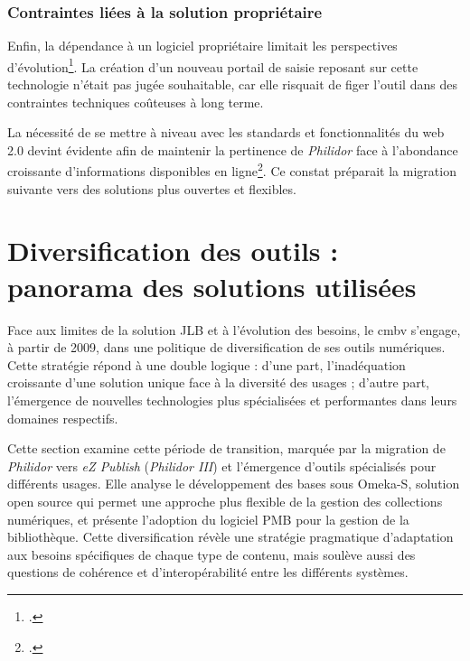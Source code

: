 \subsubsection{Contraintes liées à la solution propriétaire}

Enfin, la dépendance à un logiciel propriétaire limitait les perspectives d'évolution\footcite[Rapport sur le projet Philidor de Jérémie Crublet, juin 2006]{michelbenoitDocumentationTechniqueBibliographique1997}. La création d'un nouveau portail de saisie reposant sur cette technologie n'était pas jugée souhaitable, car elle risquait de figer l'outil dans des contraintes techniques coûteuses à long terme. 

La nécessité de se mettre à niveau avec les standards et fonctionnalités du web 2.0 devint évidente afin de maintenir la pertinence de \textit{Philidor} face à l'abondance croissante d'informations disponibles en ligne\footcite[Présentation de la base de données PHILIDOR en Octobre 2010]{michelbenoitDocumentationTechniqueBibliographique1997}. Ce constat préparait la migration suivante vers des solutions plus ouvertes et flexibles.

\section[Diversification des outils]{Diversification des outils : panorama des solutions utilisées}

Face aux limites de la solution JLB et à l'évolution des besoins, le \gls{cmbv} s'engage, à partir de 2009, dans une politique de diversification de ses outils numériques. Cette stratégie répond à une double logique : d'une part, l'inadéquation croissante d'une solution unique face à la diversité des usages ; d'autre part, l'émergence de nouvelles technologies plus spécialisées et performantes dans leurs domaines respectifs.

Cette section examine cette période de transition, marquée par la migration de \textit{Philidor} vers \textit{eZ Publish} (\textit{Philidor III}) et l'émergence d'outils spécialisés pour différents usages. Elle analyse le développement des bases sous Omeka-S, solution open source qui permet une approche plus flexible de la gestion des collections numériques, et présente l'adoption du logiciel PMB pour la gestion de la bibliothèque. Cette diversification révèle une stratégie pragmatique d'adaptation aux besoins spécifiques de chaque type de contenu, mais soulève aussi des questions de cohérence et d'interopérabilité entre les différents systèmes.

